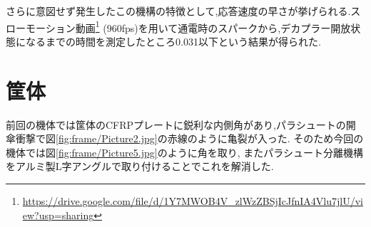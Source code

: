 さらに意図せず発生したこの機構の特徴として,応答速度の早さが挙げられる.スローモーション動画\footnote{\url{https://drive.google.com/file/d/1Y7MWOB4V_zlWzZBSjIcJfnIA4Vlu7jlU/view?usp=sharing}}
(960fps)を用いて通電時のスパークから,デカプラー開放状態になるまでの時間を測定したところ0.031\si{\sec}以下という結果が得られた.
\newpage
\section{筐体}
前回の機体では筐体のCFRPプレートに鋭利な内側角があり,パラシュートの開傘衝撃で図\ref{fig:frame/Picture2.jpg}の赤線のように亀裂が入った.
そのため今回の機体では図\ref{fig:frame/Picture5.jpg}のように角を取り,
またパラシュート分離機構をアルミ製L字アングルで取り付けることでこれを解消した.
